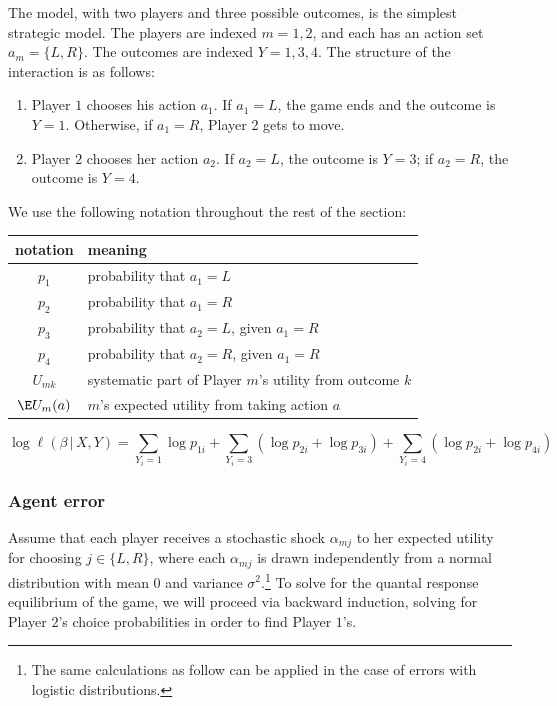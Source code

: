 \documentclass[article]{jss}
\begin{document}
The  model, with two players and three possible outcomes, is the
simplest strategic model.  The players are indexed $m = 1, 2$, and each has an
action set $a_m = \{L, R\}$.  The outcomes are indexed $Y = 1, 3, 4$.  The
structure of the interaction is as follows:
\begin{enumerate}
  \item Player $1$ chooses his action $a_1$.  If $a_1 = L$, the game ends and
  the outcome is $Y = 1$.  Otherwise, if $a_1 = R$, Player 2 gets to move.
  \item Player $2$ chooses her action $a_2$.  If $a_2 = L$, the outcome is $Y =
  3$; if $a_2 = R$, the outcome is $Y = 4$.
\end{enumerate}
We use the following notation throughout the rest of the section:
\begin{center}
  \begin{tabular}{cl}
    notation & meaning \\ \hline
    $p_1$ & probability that $a_1 = L$ \\
    $p_2$ & probability that $a_1 = R$ \\
    $p_3$ & probability that $a_2 = L$, given $a_1 = R$ \\
    $p_4$ & probability that $a_2 = R$, given $a_1 = R$ \\
    $U_{mk}$ & systematic part of Player $m$'s utility from outcome $k$ \\
    $\E U_m(a)$ & $m$'s expected utility from taking action $a$
  \end{tabular}
\end{center}


\begin{equation}
  \label{eq:log-lik}
  \log \ell(\beta \,|\, X, Y) = \sum_{Y_i = 1} \log p_{1i} + \sum_{Y_i = 3}
  (\log p_{2i} + \log p_{3i}) + \sum_{Y_i = 4} (\log p_{2i} + \log p_{4i})
\end{equation}

\subsubsection{Agent error}

Assume that each player receives a stochastic shock $\alpha_{mj}$ to her
expected utility for choosing $j \in \{L, R\}$, where each $\alpha_{mj}$ is
drawn independently from a normal distribution with mean $0$ and variance
$\sigma^2$.\footnote{The same calculations as follow can be applied in the case
  of errors with logistic distributions.}  To solve for the quantal response
equilibrium of the game, we will proceed via backward induction, solving for
Player $2$'s choice probabilities in order to find Player $1$'s.
\end{document}
